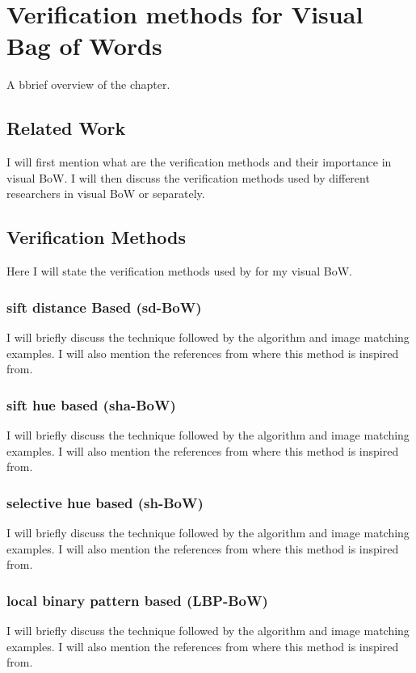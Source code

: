 \chapter{Verification methods for Visual Bag of Words}
A bbrief overview of the chapter.

\section{Related Work}
I will first mention what are the verification methods 
and their importance in visual BoW.
I will then discuss the verification methods used
by different researchers in visual BoW 
or separately.


\section{Verification Methods}
Here I will state the verification methods used by 
for my visual BoW.

\subsection{sift distance Based (sd-BoW)}
I will briefly discuss the technique followed 
by the algorithm and image matching examples.
I will also mention the references from where 
this method is inspired from.

\subsection{sift hue based (sha-BoW)}
I will briefly discuss the technique followed 
by the algorithm and image matching examples.
I will also mention the references from where 
this method is inspired from.


\subsection{selective hue based (sh-BoW)}
I will briefly discuss the technique followed 
by the algorithm and image matching examples.
I will also mention the references from where 
this method is inspired from.


\subsection{local binary pattern based (LBP-BoW)}
I will briefly discuss the technique followed 
by the algorithm and image matching examples.
I will also mention the references from where 
this method is inspired from.

